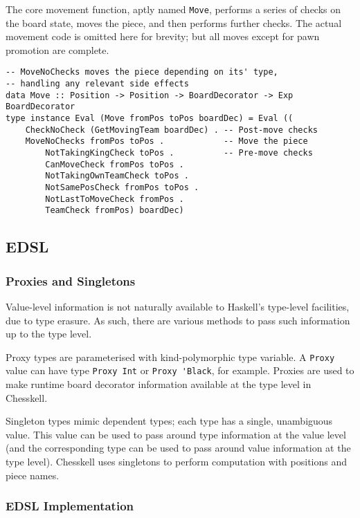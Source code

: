 \documentclass[12pt, a4paper]{scrartcl}
\begin{document}
The core movement function, aptly named \lstinline{Move}, performs a series of checks on the board state, moves the piece, and then performs further checks. The actual movement code is omitted here for brevity; but all moves except for pawn promotion are complete.

\begin{lstlisting}
-- MoveNoChecks moves the piece depending on its' type,
-- handling any relevant side effects
data Move :: Position -> Position -> BoardDecorator -> Exp BoardDecorator
type instance Eval (Move fromPos toPos boardDec) = Eval ((
    CheckNoCheck (GetMovingTeam boardDec) . -- Post-move checks
    MoveNoChecks fromPos toPos .            -- Move the piece
        NotTakingKingCheck toPos .          -- Pre-move checks
        CanMoveCheck fromPos toPos .
        NotTakingOwnTeamCheck toPos .
        NotSamePosCheck fromPos toPos .
        NotLastToMoveCheck fromPos .
        TeamCheck fromPos) boardDec)
\end{lstlisting}

\subsection{EDSL}

\subsubsection{Proxies and Singletons}

Value-level information is not naturally available to Haskell's type-level facilities, due to type erasure. As such, there are various methods to pass such information up to the type level.

Proxy types are parameterised with kind-polymorphic type variable. A \lstinline{Proxy} value can have type \lstinline{Proxy Int} or \lstinline{Proxy 'Black}, for example. Proxies are used to make runtime board decorator information available at the type level in Chesskell.

Singleton types mimic dependent types\cite{singletons}; each type has a single, unambiguous value. This value can be used to pass around type information at the value level (and the corresponding type can be used to pass around value information at the type level). Chesskell uses singletons to perform computation with positions and piece names.

\subsubsection{EDSL Implementation}
\end{document}
